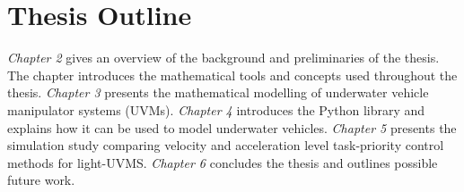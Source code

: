 \section{Thesis Outline}

\emph{Chapter 2} gives an overview of the background and preliminaries of the
thesis. The chapter introduces the mathematical tools and concepts used throughout
the thesis. \emph{Chapter 3} presents the mathematical modelling of underwater
vehicle manipulator systems (UVMs). \emph{Chapter 4} introduces the Python library
\pymuvs and explains how it can be used to model underwater vehicles. \emph{Chapter 5}
presents the simulation study comparing velocity and acceleration level task-priority
control methods for light-UVMS. \emph{Chapter 6} concludes the thesis and outlines
possible future work.
